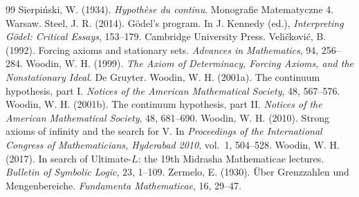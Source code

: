 \documentclass{situationist-preprint}
\begin{document}
\begin{thebibliography}{99}
 Sierpi\'nski, W. (1934). \emph{Hypothèse du continu}. Monografie Matematyczne 4. Warsaw.
 Steel, J. R. (2014). Gödel's program. In J. Kennedy (ed.), \emph{Interpreting Gödel: Critical Essays}, 153--179. Cambridge University Press.
 Veli\v{c}kovi\'c, B. (1992). Forcing axioms and stationary sets. \emph{Advances in Mathematics}, 94, 256--284.
 Woodin, W. H. (1999). \emph{The Axiom of Determinacy, Forcing Axioms, and the Nonstationary Ideal}. De Gruyter.
 Woodin, W. H. (2001a). The continuum hypothesis, part I. \emph{Notices of the American Mathematical Society}, 48, 567--576.
 Woodin, W. H. (2001b). The continuum hypothesis, part II. \emph{Notices of the American Mathematical Society}, 48, 681--690.
 Woodin, W. H. (2010). Strong axioms of infinity and the search for V. In \emph{Proceedings of the International Congress of Mathematicians, Hyderabad 2010}, vol.~1, 504--528.
 Woodin, W. H. (2017). In search of Ultimate-$L$: the 19th Midrasha Mathematicae lectures. \emph{Bulletin of Symbolic Logic}, 23, 1--109.
 Zermelo, E. (1930). Über Grenzzahlen und Mengenbereiche. \emph{Fundamenta Mathematicae}, 16, 29--47.
\end{thebibliography}
\end{document}
